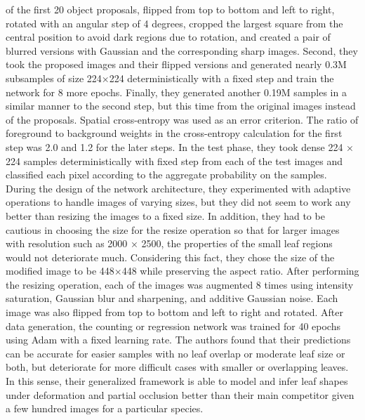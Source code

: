 of the first 20 object proposals, flipped from top to bottom and left to right, rotated with an angular step of 4 degrees, cropped the largest square from the central
position to avoid dark regions due to rotation, and created a pair of blurred versions with Gaussian and the corresponding sharp images. Second, they took the proposed
images and their flipped versions and generated nearly 0.3M subsamples of size 224×224 deterministically with a fixed step and train the network for 8 more epochs.
Finally, they generated another 0.19M samples in a similar manner to the second step, but this time from the original images instead of the proposals. Spatial
cross-entropy was used as an error criterion. The ratio of foreground to background weights in the cross-entropy calculation for the first step was 2.0 and 1.2
for the later steps. In the test phase, they took dense 224 × 224 samples deterministically with fixed step from each of the test images and classified each pixel
according to the aggregate probability on the samples. During the design of the network architecture, they experimented with adaptive operations to handle images
of varying sizes, but they did not seem to work any better than resizing the images to a fixed size. In addition, they had to be cautious in choosing the size for
the resize operation so that for larger images with resolution such as 2000 × 2500, the properties of the small leaf regions would not deteriorate much. Considering
this fact, they chose the size of the modified image to be 448×448 while preserving the aspect ratio. After performing the resizing operation, each of the images was
augmented 8 times using intensity saturation, Gaussian blur and sharpening, and additive Gaussian noise. Each image was also flipped from top to bottom and left to
right and rotated. After data generation, the counting or regression network was trained for 40 epochs using Adam with a fixed learning rate. The authors found that
their predictions can be accurate for easier samples with no leaf overlap or moderate leaf size or both, but deteriorate for more difficult cases with smaller or overlapping
leaves. In this sense, their generalized framework is able to model and infer leaf shapes under deformation and partial occlusion better than their main competitor given a
few hundred images for a particular species.\cite{Aich_2017_ICCV}

